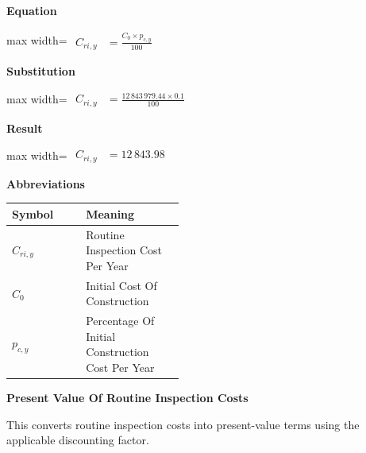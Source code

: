 \documentclass{article}
\begin{document}
\vspace{0.4em}
\textbf{Equation}\par\vspace{-0.35em}
\begin{center}
\begin{adjustbox}{max width=\linewidth}
$\displaystyle\begin{aligned}
C_{ri,y} &= \frac{C_0 \times p_{c,y}}{100}
\end{aligned}$
\end{adjustbox}
\end{center}
\vspace{0.4em}
\textbf{Substitution}\par\vspace{-0.35em}
\begin{center}
\begin{adjustbox}{max width=\linewidth}
$\displaystyle\begin{aligned}
C_{ri,y} &= \frac{12\,843\,979.44 \times 0.1}{100}
\end{aligned}$
\end{adjustbox}
\end{center}
\vspace{0.4em}
\textbf{Result}\par\vspace{-0.35em}
\begin{center}
\begin{adjustbox}{max width=\linewidth}
$\displaystyle\begin{aligned}
C_{ri,y} &= 12\,843.98
\end{aligned}$
\end{adjustbox}
\end{center}
\vspace{0.4em}
\textbf{Abbreviations}\par\vspace{-0.35em}
\begin{tabularx}{\linewidth}{>{\raggedright\arraybackslash}p{0.43\linewidth} >{\raggedright\arraybackslash}X}
\toprule
Symbol & Meaning \\
\midrule
$C_{ri,y}$ & Routine Inspection Cost Per Year \\
$C_0$ & Initial Cost Of Construction \\
$p_{c,y}$ & Percentage Of Initial Construction Cost Per Year \\
\bottomrule
\end{tabularx}
\vspace{0.6em}
\vspace{0.4em}
\textbf{Present Value Of Routine Inspection Costs}\par\vspace{-0.35em}
This converts routine inspection costs into present-value terms using the applicable discounting factor.
\end{document}
